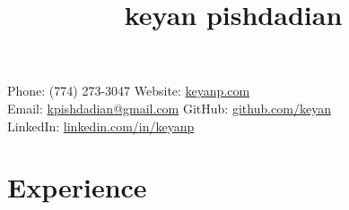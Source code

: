 \documentclass[letterpaper,hidelinks]{scrartcl}
\begin{document}
\title{keyan pishdadian}

Phone: (774) 273-3047 \hfill Website: \href{http://keyanp.com}{keyanp.com} \\
Email: \href{mailto:kpishdadian@gmail.com}{kpishdadian@gmail.com} \hfill GitHub: \href{https://github.com/keyan}{github.com/keyan} \\
LinkedIn: \href{https://linkedin.com/in/keyanp}{linkedin.com/in/keyanp}

%
%


%
%

\section*{Experience}
\end{document}
